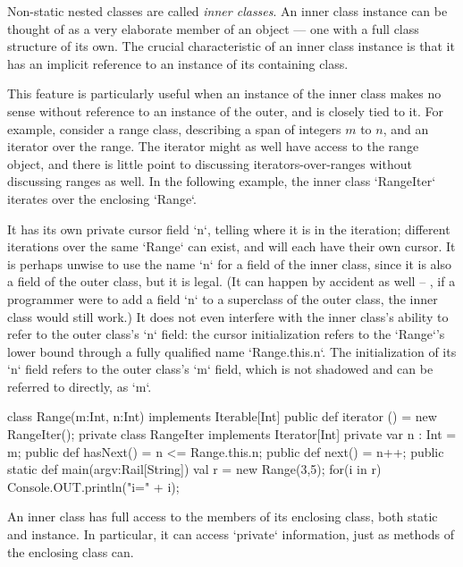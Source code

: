 Non-static nested classes are called {\em inner classes}. An inner class
instance can be thought of as a very elaborate member of an object --- one
with a full class structure of its own.   The crucial characteristic of an
inner class instance is that it has an implicit reference to an instance of
its containing class.  

\begin{ex}
This feature is particularly useful when an instance of the inner class makes
no sense without reference to an instance of the outer, and is closely tied to
it.  For example, consider a range class, describing a span of integers {$m$}
to {$n$}, and an iterator over the range.  The iterator might as well have
access to the range object, and there is little point to discussing
iterators-over-ranges without discussing ranges as well.
In the following example, the inner class \xcd`RangeIter` iterates over the
enclosing \xcd`Range`.  

It has its own private cursor field \xcd`n`, telling
where it is in the iteration; different iterations over the same \xcd`Range`
can exist, and will each have their own cursor.
It is perhaps unwise to use the name \xcd`n` for a field of the inner class,
since it is also a field of the outer class, but it is legal.  (It can happen
by accident as well -- \eg, if a programmer were to add a field \xcd`n` to a
superclass of the  outer class, the inner class would still work.)
It does not even
interfere with the inner class's ability to refer to the outer class's \xcd`n`
field: the cursor initialization 
refers to the \xcd`Range`'s lower bound through a fully qualified name
\xcd`Range.this.n`.
The initialization of its \xcd`n` field refers to the outer class's \xcd`m` field, which is
not shadowed and can be referred to directly, as \xcd`m`.


\begin{xten}
class Range(m:Int, n:Int) implements Iterable[Int]{
  public def iterator ()  = new RangeIter();
  private class RangeIter implements Iterator[Int] {
     private var n : Int = m;
     public def hasNext() = n <= Range.this.n;
     public def next() = n++;
  }
  public static def main(argv:Rail[String]) {
    val r = new Range(3,5);
    for(i in r) Console.OUT.println("i=" + i);
  }
}
\end{xten}
%
\end{ex}

An inner class has full access to the members of its enclosing class, both
static and instance.  In particular, it can access \xcd`private` information,
just as methods of the enclosing class can.  

